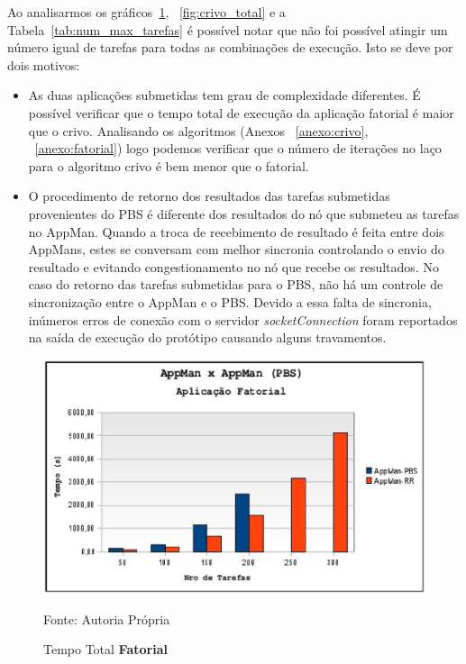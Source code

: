 Ao analisarmos os gráficos~\ref{fig:fatorial_total}, ~\ref{fig:crivo_total} e a Tabela~\ref{tab:num_max_tarefas} é possível notar que não foi possível atingir um número igual de tarefas para todas as combinações de execução. Isto se deve por dois motivos:

\begin{itemize}
	\item As duas aplicações submetidas tem grau de complexidade diferentes.
		É possível verificar que o tempo total de execução da aplicação fatorial é maior que o crivo. Analisando os algoritmos (Anexos ~\ref{anexo:crivo}, ~\ref{anexo:fatorial}) logo podemos verificar que o número de iterações no laço para o algoritmo crivo é bem menor que o fatorial.
	\item O procedimento de retorno dos resultados das tarefas submetidas provenientes do PBS é diferente dos resultados do nó que submeteu as tarefas no AppMan. Quando a troca de recebimento de resultado é feita entre dois AppMans, estes se conversam com melhor sincronia controlando o envio do resultado e evitando congestionamento no nó que recebe os resultados. No caso do retorno das tarefas submetidas para o PBS, não há um controle de sincronização entre o AppMan e o PBS. Devido a essa falta de sincronia, inúmeros erros de conexão com o servidor \emph{socketConnection} foram reportados na saída de execução do protótipo causando alguns travamentos.
\end{itemize}

\begin{figure}[htb]
\begin{center}
\includegraphics[scale=0.77]{./img/MapaFatorialTempoTotal.ps}
\caption{Tempo Total \textbf{Fatorial}}
\label{fig:fatorial_total}
Fonte: Autoria Própria
\end{center}
\end{figure}

